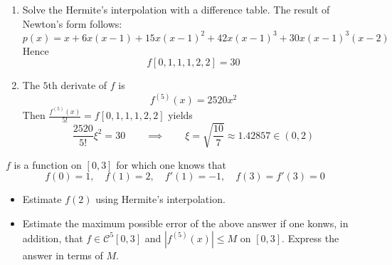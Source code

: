 \documentclass[11pt]{elegantbook}
\begin{document}
\begin{solution}
  \begin{enumerate}
    \item Solve the Hermite's interpolation with a difference table. The result of Newton's form follows:
    \begin{equation*}
      p(x)=x+6x(x-1)+15x(x-1)^2+42x(x-1)^3+30x(x-1)^3(x-2)
    \end{equation*}
    Hence
    \begin{equation*}
      f[0,1,1,1,2,2]=30
    \end{equation*}

    \item The $5$th derivate of $f$ is
    \begin{equation*}
      f^{(5)}(x)=2520x^2
    \end{equation*}
    Then $\frac{f^{(5)}(x)}{5!}=f[0,1,1,1,2,2]$ yields
    \begin{equation*}
      \frac{2520}{5!}\xi^2=30 \qquad \implies \qquad \xi=\sqrt{\frac{10}{7}}\approx 1.42857\in(0,2)
    \end{equation*}
  \end{enumerate}
\end{solution}

\vspace{1.5em}

\begin{problem}
  $f$ is a function on $[0,3]$ for which one knows that
  \begin{equation*}
    f(0)=1,\quad f(1)=2,\quad f'(1)=-1,\quad f(3)=f'(3)=0
  \end{equation*}
  \begin{itemize}
    \item Estimate $f(2)$ using Hermite's interpolation.
    \item Estimate the maximum possible error of the above answer if one konws, in addition, that $f\in \mathcal{C}^5[0,3]$ and $|f^{(5)}(x)|\leq M$ on $[0,3]$. Express the answer in terms of $M$.
  \end{itemize}
\end{problem}
\end{document}
